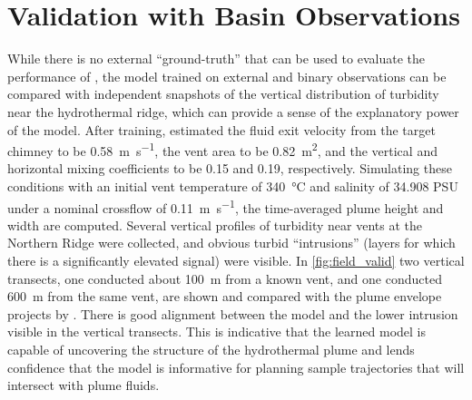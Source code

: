 \section{\PHUMES Validation with Basin Observations}
\label{sec:field_phumes}
While there is no external ``ground-truth'' that can be used to evaluate the performance of \PHORTEX, the \PHUMES model trained on external and binary \Sentry observations can be compared with independent snapshots of the vertical distribution of turbidity near the hydrothermal ridge, which can provide a sense of the explanatory power of the \PHUMES model. After training, \PHUMES estimated the fluid exit velocity from the target chimney to be \SI{0.58}{\meter\per\second}, the vent area to be \SI{0.82}{\meter\squared}, and the vertical and horizontal mixing coefficients to be 0.15 and 0.19, respectively. Simulating these conditions with an initial vent temperature of \SI{340}{\celsius} and salinity of 34.908 PSU under a nominal crossflow of \SI{0.11}{\meter\per\second}, the time-averaged plume height and width are computed. Several vertical profiles of turbidity near vents at the Northern Ridge were collected, and obvious turbid ``intrusions'' (layers for which there is a significantly elevated signal) were visible. In \cref{fig:field_valid} two vertical transects, one conducted about \SI{100}{\meter} from a known vent, and one conducted \SI{600}{\meter} from the same vent, are shown and compared with the plume envelope projects by \PHUMES. There is good alignment between the model and the lower intrusion visible in the vertical transects. This is indicative that the learned \PHUMES model is capable of uncovering the structure of the hydrothermal plume and lends confidence that the model is informative for planning sample trajectories that will intersect with plume fluids.


